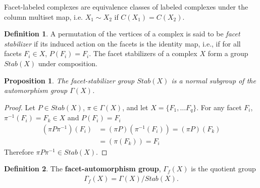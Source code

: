 \documentclass[12pt]{article}
\theoremstyle{plain}
\newtheorem{prop}[thm]{Proposition}
\theoremstyle{definition}
\newtheorem{defn}{Definition}[section]
\theoremstyle{remark}
\newcommand{\CR}{\nonumber\\}
\begin{document}

Facet-labeled complexes are equivalence classes of labeled complexes under the column multiset map, i.e. $X_1\sim X_2$ if $C(X_1)=C(X_2)$.  

\begin{defn}
A permutation of the vertices of a complex is said to be {\em facet stabilizer} if its induced action on the facets is the identity map, i.e., if for all facets $F_i\in X$, $P(F_i) = F_i$. The facet stabilizers of a complex $X$ form a group $Stab(X)$ under composition.
\end{defn}

\begin{prop}
 The facet-stabilizer group $Stab(X)$ is a normal subgroup of the automorphism group $\Gamma(X)$. 
\end{prop}

\begin{proof}
    Let $P\in Stab(X)$, $\pi\in\Gamma(X)$, and let $X=\{F_1,\dots F_q\}$. For any facet $F_i$, $\pi^{-1}(F_i)=F_k\in X$ and $P(F_i)=F_i$
    \begin{align}
        (\pi P\pi^{-1})(F_i)&=(\pi P)(\pi^{-1}(F_i))=(\pi P)(F_k)\CR
        &=(\pi (F_k))=F_i
    \end{align}
    Therefore $\pi P \pi^{-1}\in Stab(X)$.
\end{proof}

\begin{defn}
    The {\bf facet-automorphism group}, $\Gamma_f(X)$ is the quotient group 
    \begin{align}
        \Gamma_f(X)=\Gamma(X)/Stab(X).
    \end{align}
\end{defn}
\end{document}
